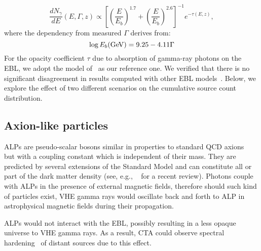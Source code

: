 \documentclass[final,5p]{elsarticle}
\begin{document}
\begin{equation} \label{eqSED}
\frac{dN_\gamma}{dE}(E,\Gamma,z)\propto \left[\left(\frac{E}{E_b}\right)^{1.7}+\left(\frac{E}{E_b}\right)^{2.6}\right]^{-1} e^{-\tau(E,z)},
\end{equation}
where the dependency from measured $\Gamma$ derives from:
\begin{equation} \label{eqEb}
\log E_b ({\rm GeV}) = 9.25 - 4.11\Gamma
\end{equation}
For the opacity coefficient $\tau$ due to absorption of gamma-ray photons on the EBL, we adopt the model of~\cite{YoshiEBL} as our reference one. We verified that there is no significant disagreement in results computed with other EBL models~\cite{DominguezEBL,FinkeEBL,SteckerEBL}. Below, we explore the effect of two different scenarios on the cumulative source count distribution.

\subsection{Axion-like particles}
ALPs are pseudo-scalar bosons similar in properties to standard QCD axions~\cite{CPViolation,PecceiQuinn} but with a coupling constant which is independent of their mass. They are predicted by several extensions of the Standard Model and can constitute all or part of the dark matter density (see, e.g., ~\cite{Axion} for a recent review). Photons couple with ALPs in the presence of external magnetic fields, therefore should such kind of particles exist, VHE gamma rays would oscillate back and forth to ALP in astrophysical magnetic fields during their propagation. 

ALPs would not interact with the EBL, possibly resulting in a less opaque universe to VHE gamma rays. As a result, CTA could observe spectral hardening~\cite{AxionCTA} of distant sources due to this effect.
\end{document}
